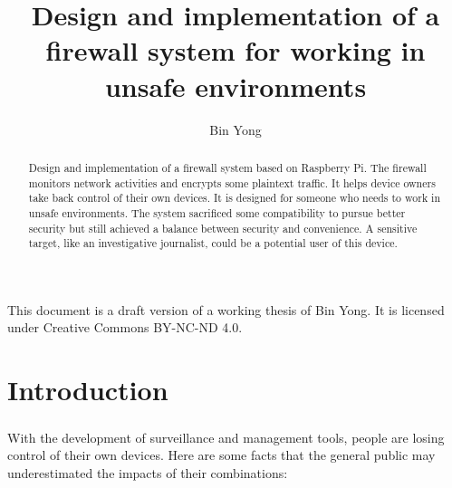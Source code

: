 \documentclass[mscthesis]{usiinfthesis}
\title{Design and implementation of a firewall system for working in unsafe environments} %
\author{Bin Yong} %
\begin{document}

\maketitle %

\frontmatter %

\begin{abstract}
  \paragraph{}
  Design and implementation of a firewall system based on Raspberry Pi. The firewall monitors network activities and encrypts some plaintext traffic. It helps device owners take back control of their own devices. It is designed for someone who needs to work in unsafe environments. The system sacrificed some compatibility to pursue better security but still achieved a balance between security and convenience. A sensitive target, like an investigative journalist, could be a potential user of this device.

\end{abstract}

\begin{acknowledgements}
  \paragraph{}
  This document is a draft version of a working thesis of Bin Yong. It is licensed under Creative Commons BY-NC-ND 4.0.
\end{acknowledgements}

\tableofcontents
\listoffigures %
\listoftables %

\mainmatter

\chapter{Introduction}
\paragraph{}
With the development of surveillance and management tools, people are losing control of their own devices. Here are some facts that the general public may underestimated the impacts of their combinations:
\end{document}
